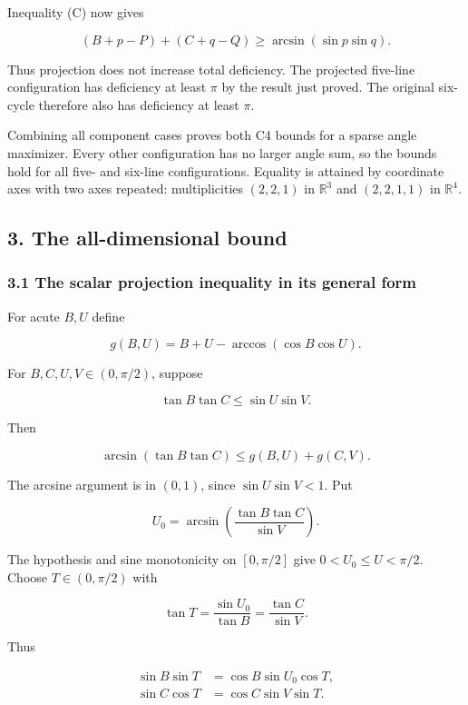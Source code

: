 \documentclass[11pt,a4paper]{article}
\begin{document}
Inequality (C) now gives

\[
(B+p-P)+(C+q-Q)\ge\arcsin(\sin p\sin q).
\]

Thus projection does not increase total deficiency. The projected five-line configuration has deficiency at least \(\pi\) by the result just proved. The original six-cycle therefore also has deficiency at least \(\pi\).

Combining all component cases proves both C4 bounds for a sparse angle maximizer. Every other configuration has no larger angle sum, so the bounds hold for all five- and six-line configurations. Equality is attained by coordinate axes with two axes repeated: multiplicities \((2,2,1)\) in \(\mathbb R^3\) and \((2,2,1,1)\) in \(\mathbb R^4\).

\subsection{3. The all-dimensional bound}\label{the-all-dimensional-bound}

\subsubsection{3.1 The scalar projection inequality in its general form}\label{the-scalar-projection-inequality-in-its-general-form}

For acute \(B,U\) define

\[
g(B,U)=B+U-\arccos(\cos B\cos U).
\]

For \(B,C,U,V\in(0,\pi/2)\), suppose

\[
\tan B\tan C\le\sin U\sin V.
\]

Then

\[
\arcsin(\tan B\tan C)\le g(B,U)+g(C,V).\tag{1}
\]

The arcsine argument is in \((0,1)\), since \(\sin U\sin V<1\). Put

\[
U_0=\arcsin\!\left(\frac{\tan B\tan C}{\sin V}\right).
\]

The hypothesis and sine monotonicity on \([0,\pi/2]\) give \(0<U_0\le U<\pi/2\). Choose \(T\in(0,\pi/2)\) with

\[
\tan T=\frac{\sin U_0}{\tan B}=\frac{\tan C}{\sin V}.
\]

Thus

\[
\begin{aligned}\sin B\sin T&=\cos B\sin U_0\cos T,\\\sin C\cos T&=\cos C\sin V\sin T.\end{aligned}
\]
\end{document}
